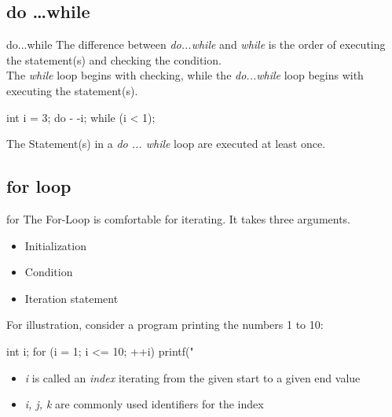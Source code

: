 \documentclass[10pt,graphics,aspectratio=169,table]{beamer}
\begin{document}
\subsection{do \ldots while}

\begin{frame}[fragile]{do...while}
    The difference between \textit{do...while} and \textit{while} is the order of executing the statement(s) and checking the condition.\\
    \bigskip
    The \textit{while} loop begins with checking, while the \textit{do...while} loop begins with executing the statement(s).
    \begin{codeblock}
int i = 3;
do {
    - -i;
} while (i < 1);
\end{codeblock}
    \bigskip
    The Statement(s) in a \textit{do ... while} loop are executed at least once.
\end{frame}

\subsection{for loop}

\begin{frame}[fragile]{for}
    The For-Loop is comfortable for iterating. It takes three arguments.
    \begin{itemize}
        \item Initialization
        \item Condition
        \item Iteration statement
    \end{itemize}
    \bigskip
    For illustration, consider a program printing the numbers 1 to 10:
    \begin{codeblock}
int i;
for (i = 1; i <= 10; ++i){
    printf("%
}
\end{codeblock}
    \begin{itemize}
        \item \textit{i} is called an \textit{index} iterating from the given start to a given end value
        \item \textit{i, j, k} are commonly used identifiers for the index
    \end{itemize}
\end{frame}
\end{document}
